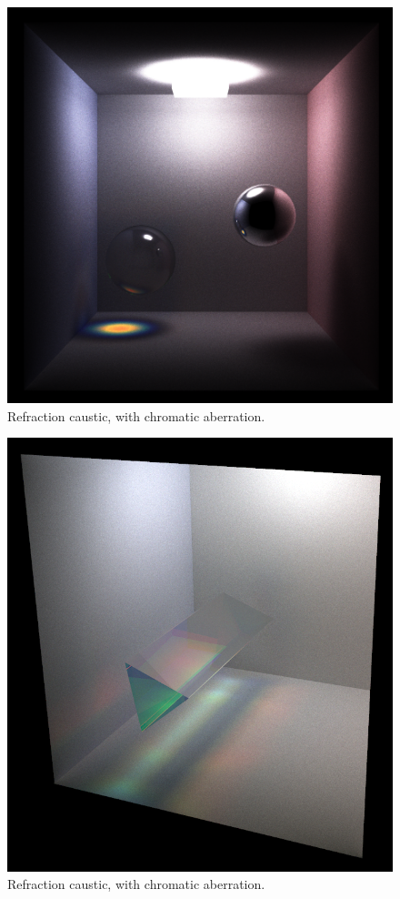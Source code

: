 \documentclass[12pt]{article}
\begin{document}
\begin{figure} 
\centering
  \includegraphics[width = 6 in]{v_rt_reflect_chromatic_aberration_low_res.png}
  \caption{ Refraction caustic, with chromatic aberration.
}
\end{figure}

\begin{figure} 
\centering
  \includegraphics[width = 6 in]{v_rt_reflect_prism.png}
  \caption{ Refraction caustic, with chromatic aberration.
}
\end{figure}
\end{document}
